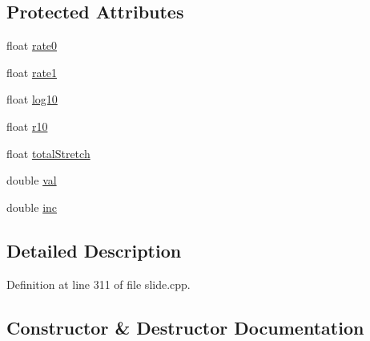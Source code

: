\subsection*{Protected Attributes}
\begin{DoxyCompactItemize}
\item 
float \hyperlink{class__sbsms___1_1_geometric_output_slide_a6da61d1b515f8e37b52bc51e998b22c7}{rate0}
\item 
float \hyperlink{class__sbsms___1_1_geometric_output_slide_a1a85935424121378a7c9efac96ab1f43}{rate1}
\item 
float \hyperlink{class__sbsms___1_1_geometric_output_slide_a6a4c6b331e85da69a2fadc47e85ec53b}{log10}
\item 
float \hyperlink{class__sbsms___1_1_geometric_output_slide_a381e2dbb1401d6a0c2a11ca3e917708c}{r10}
\item 
float \hyperlink{class__sbsms___1_1_geometric_output_slide_a7e4a4a96e8aa6ba3a1c659c8dbe08983}{total\+Stretch}
\item 
double \hyperlink{class__sbsms___1_1_geometric_output_slide_a47324460a87eb315bef9765f84d69c6a}{val}
\item 
double \hyperlink{class__sbsms___1_1_geometric_output_slide_a3d98bbff906aebf5a812aa8bfd133be5}{inc}
\end{DoxyCompactItemize}


\subsection{Detailed Description}


Definition at line 311 of file slide.\+cpp.



\subsection{Constructor \& Destructor Documentation}
